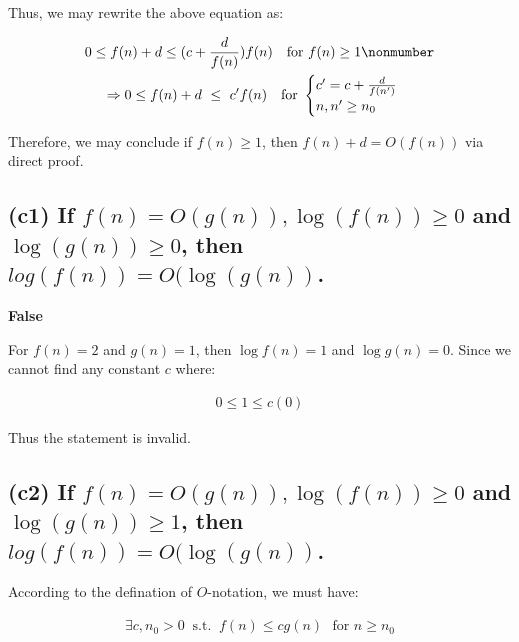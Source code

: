 \documentclass[12pt]{article}
\begin{document}
Thus, we may rewrite the above equation as:


\begin{gather}
    0 \leq f(n)+d \leq (c + \frac{d}{f(n)})f(n) \ \ \ \text{for $f(n) \geq 1$} \nonmumber\\
    \Rightarrow 0 \leq f(n)+d \ \leq \ c'f(n) \ \ \ \text{for } \begin{cases}
                     c' = c + \frac{d}{f(n')} \\
                     n, n' \geq n_{0}
                 \end{cases}
\end{gather}

Therefore, we may conclude if $f(n) \geq 1$, then $f(n) + d = O(f(n))$ via direct proof.




\subsection{(c1) If $f(n) = O(g(n)), \log(f(n)) \geq 0$ and $\log(g(n)) \geq 0$, then $log(f(n)) = O(\log(g(n))$.}

\textbf{False}

For $f(n) = 2$ and $g(n) = 1$, then $\log f(n) = 1$ and $\log g(n) = 0$. Since we cannot find any constant $c$ where:

\begin{gather}
    0 \leq 1 \leq c(0)
\end{gather}

Thus the statement is invalid.

\subsection{(c2) If $f(n) = O(g(n)), \log(f(n)) \geq 0$ and $\log(g(n)) \geq 1$, then $log(f(n)) = O(\log(g(n))$.}



According to the defination of $O$-notation, we must have:

\begin{gather}
    \exists c, n_{0} > 0 \ \text{ s.t. } \ f(n) \leq cg(n) \ \ \ \text{for $n \geq n_{0}$}
\end{gather}
\end{document}
